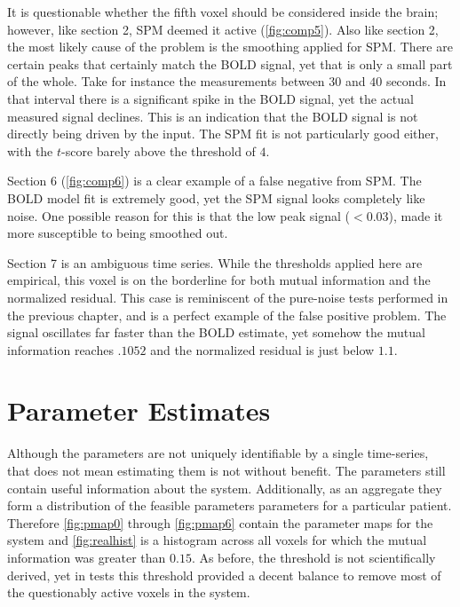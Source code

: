 It is questionable whether the fifth voxel should be considered inside the
brain; however, like section 2, SPM deemed it active (\autoref{fig:comp5}).
Also like section 2, the most likely cause of the problem is the smoothing
applied for SPM. There are certain peaks that certainly match the
BOLD signal, yet that is only a small part of the whole.
Take for instance the measurements between $30$ and $40$ seconds.
In that interval there is a significant spike in the BOLD signal, yet the
actual measured signal declines. This is an indication that the BOLD signal is not directly
being driven by the input. The SPM fit is not particularly good either,
with the $t$-score barely above the threshold of $4$.

Section 6 (\autoref{fig:comp6}) is a clear example of a false negative
from SPM. The BOLD model fit is extremely good, yet the SPM signal looks completely
like noise. One possible reason for this is that the low peak signal ($<0.03$),
made it more susceptible to being smoothed out.

Section 7 is an ambiguous time series. While the thresholds applied here
are empirical, this voxel is on the borderline for both mutual information
and the normalized residual.
This case is reminiscent of the pure-noise tests performed in the previous chapter,
and is a perfect example of the false positive problem.
The signal oscillates far faster than the BOLD estimate, yet
somehow the mutual information reaches $.1052$ and the normalized residual is just below $1.1$.

\section{Parameter Estimates}
\label{sec:Real Data Parameter Estimates}
Although the parameters are not uniquely identifiable by a single time-series, that
does not mean estimating them is not without benefit. The parameters still contain useful
information about the system. Additionally, as an aggregate they form a distribution of
the feasible parameters parameters for a particular patient. Therefore
\autoref{fig:pmap0} through \autoref{fig:pmap6}
contain the parameter maps for the system and \autoref{fig:realhist} is a histogram across all voxels
for which the mutual information was greater than $0.15$. As before, the threshold is not
scientifically derived, yet in tests this threshold provided a decent balance to remove most
of the questionably active voxels in the system.

